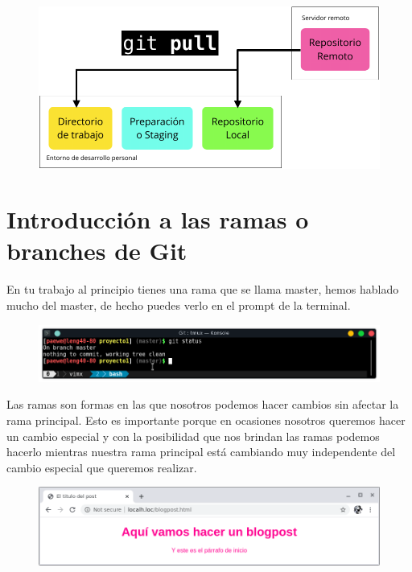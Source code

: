 \documentclass{article}
\begin{document}
\newpage

\begin{figure}[h!]
  \centering
  \includegraphics[scale=0.6]{./Pictures/126_git_pull.png}
\end{figure}

\newpage

\section{Introducción a las ramas o branches de Git}%
En tu trabajo al principio tienes una rama que se llama master, hemos hablado
mucho del master, de hecho puedes verlo en el prompt de la terminal.

\begin{figure}[h!]
  \centering
  \includegraphics[scale=0.75]{./Pictures/127_master.png}
\end{figure}

Las ramas son formas en las que nosotros podemos hacer cambios sin afectar la
rama principal. Esto es importante porque en ocasiones nosotros queremos hacer
un cambio especial y con la posibilidad que nos brindan las ramas podemos
hacerlo mientras nuestra rama principal está cambiando muy independente del
cambio especial que queremos realizar.\\

\begin{figure}[h!]
  \centering
  \includegraphics[scale=0.75]{./Pictures/128_blogpost_chrome.png}
\end{figure}
\end{document}
